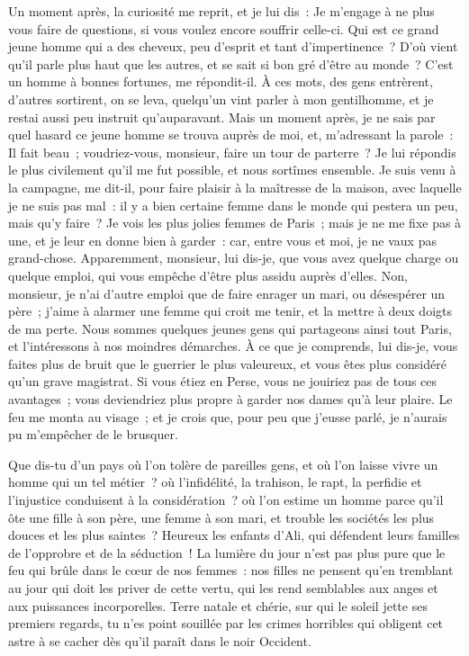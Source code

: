 \documentclass[french,twoside]{book} %
\begin{document}
Un moment après, la curiosité me reprit, et je lui dis : Je m’engage à ne plus vous faire de questions, si vous voulez encore souffrir celle-ci. Qui est ce grand jeune homme qui a des cheveux, peu d’esprit et tant d’impertinence ? D’où vient qu’il parle plus haut que les autres, et se sait si bon gré d’être au monde ? C’est un homme à bonnes fortunes, me répondit-il. À ces mots, des gens entrèrent, d’autres sortirent, on se leva, quelqu’un vint parler à mon gentilhomme, et je restai aussi peu instruit qu’auparavant. Mais un moment après, je ne sais par quel hasard ce jeune homme se trouva auprès de moi, et, m’adressant la parole : Il fait beau ; voudriez-vous, monsieur, faire un tour de parterre ? Je lui répondis le plus civilement qu’il me fut possible, et nous sortîmes ensemble. Je suis venu à la campagne, me dit-il, pour faire plaisir à la maîtresse de la maison, avec laquelle je ne suis pas mal : il y a bien certaine femme dans le monde qui pestera un peu, mais qu’y faire ? Je vois les plus jolies femmes de Paris ; mais je ne me fixe pas à une, et je leur en donne bien à garder : car, entre vous et moi, je ne vaux pas grand-chose. Apparemment, monsieur, lui dis-je, que vous avez quelque charge ou quelque emploi, qui vous empêche d’être plus assidu auprès d’elles. Non, monsieur, je n’ai d’autre emploi que de faire enrager un mari, ou désespérer un père ; j’aime à alarmer une femme qui croit me tenir, et la mettre à deux doigts de ma perte. Nous sommes quelques jeunes gens qui partageons ainsi tout Paris, et l’intéressons à nos moindres démarches. À ce que je comprends, lui dis-je, vous faites plus de bruit que le guerrier le plus valeureux, et vous êtes plus considéré qu’un grave magistrat. Si vous étiez en Perse, vous ne jouiriez pas de tous ces avantages ; vous deviendriez plus propre à garder nos dames qu’à leur plaire. Le feu me monta au visage ; et je crois que, pour peu que j’eusse parlé, je n’aurais pu m’empêcher de le brusquer.\par
Que dis-tu d’un pays où l’on tolère de pareilles gens, et où l’on laisse vivre un homme qui un tel métier ? où l’infidélité, la trahison, le rapt, la perfidie et l’injustice conduisent à la considération ? où l’on estime un homme parce qu’il ôte une fille à son père, une femme à son mari, et trouble les sociétés les plus douces et les plus saintes ? Heureux les enfants d’Ali, qui défendent leurs familles de l’opprobre et de la séduction ! La lumière du jour n’est pas plus pure que le feu qui brûle dans le cœur de nos femmes : nos filles ne pensent qu’en tremblant au jour qui doit les priver de cette vertu, qui les rend semblables aux anges et aux puissances incorporelles. Terre natale et chérie, sur qui le soleil jette ses premiers regards, tu n’es point souillée par les crimes horribles qui obligent cet astre à se cacher dès qu’il paraît dans le noir Occident.\par
\end{document}
